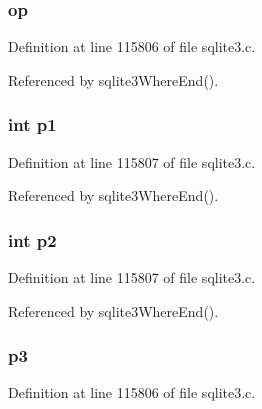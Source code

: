 \hypertarget{struct_where_level_a0991b29aa40e12f033237266ebe6610c}{}
\subsubsection[{op}]{ op}\label{struct_where_level_a0991b29aa40e12f033237266ebe6610c}


Definition at line 115806 of file sqlite3.\+c.



Referenced by sqlite3\+Where\+End().

\hypertarget{struct_where_level_a8d5504470de9fec69f0389092910c500}{}
\subsubsection[{p1}]{\setlength{\rightskip}{0pt plus 5cm}int p1}\label{struct_where_level_a8d5504470de9fec69f0389092910c500}


Definition at line 115807 of file sqlite3.\+c.



Referenced by sqlite3\+Where\+End().

\hypertarget{struct_where_level_a2fbbf5056a49832e7d5e73a15ae2ee05}{}
\subsubsection[{p2}]{\setlength{\rightskip}{0pt plus 5cm}int p2}\label{struct_where_level_a2fbbf5056a49832e7d5e73a15ae2ee05}


Definition at line 115807 of file sqlite3.\+c.



Referenced by sqlite3\+Where\+End().

\hypertarget{struct_where_level_a47eadd11a1fdd79088fa6e4e6be69cd4}{}
\subsubsection[{p3}]{ p3}\label{struct_where_level_a47eadd11a1fdd79088fa6e4e6be69cd4}


Definition at line 115806 of file sqlite3.\+c.



